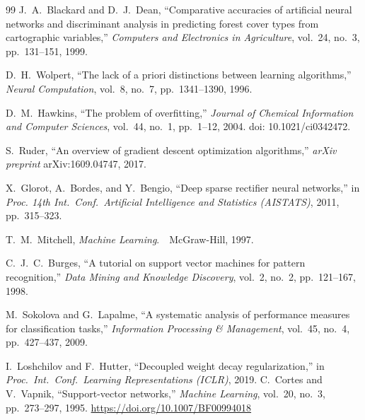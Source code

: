 \documentclass[conference]{IEEEtran}
\begin{document}
\begin{thebibliography}{99}\footnotesize\setlength{\itemsep}{0pt}\setlength{\parsep}{0pt}\setlength{\bibsep}{0pt}
J.~A.~Blackard and D.~J.~Dean,
``Comparative accuracies of artificial neural networks and discriminant
analysis in predicting forest cover types from cartographic variables,''
\emph{Computers and Electronics in Agriculture}, vol.~24, no.~3,
pp.~131--151, 1999.

D.~H.~Wolpert,
``The lack of a priori distinctions between learning algorithms,''
\emph{Neural Computation}, vol.~8, no.~7, pp.~1341--1390, 1996.

D.~M.~Hawkins,
``The problem of overfitting,''
\emph{Journal of Chemical Information and Computer Sciences},
vol.~44, no.~1, pp.~1--12, 2004. doi: 10.1021/ci0342472.

S.~Ruder,
``An overview of gradient descent optimization algorithms,''
\emph{arXiv preprint} arXiv:1609.04747, 2017.

X.~Glorot, A.~Bordes, and Y.~Bengio,
``Deep sparse rectifier neural networks,''
in \emph{Proc. 14th Int.\ Conf.\ Artificial Intelligence and Statistics
(AISTATS)}, 2011, pp.~315--323.

T.~M.~Mitchell, \emph{Machine Learning}.\ \ McGraw-Hill, 1997.

C.~J.~C.~Burges,
``A tutorial on support vector machines for pattern recognition,''
\emph{Data Mining and Knowledge Discovery}, vol.~2, no.~2,
pp.~121--167, 1998.

M.~Sokolova and G.~Lapalme,
``A systematic analysis of performance measures for classification tasks,''
\emph{Information Processing \& Management}, vol.~45, no.~4,
pp.~427--437, 2009.

I.~Loshchilov and F.~Hutter,
``Decoupled weight decay regularization,''
in \emph{Proc.\ Int.\ Conf.\ Learning Representations (ICLR)}, 2019.
C.~Cortes and V.~Vapnik,
``Support-vector networks,''
\textit{Machine Learning}, vol.~20, no.~3, pp.~273--297, 1995.
\url{https://doi.org/10.1007/BF00994018}

\end{thebibliography}
\end{document}
